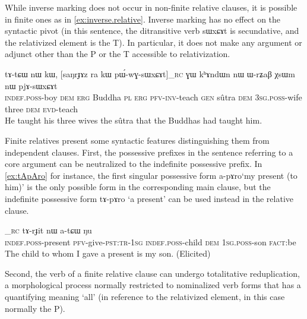 \documentclass[oldfontcommands,oneside,a4paper,11pt]{article}
\newcommand{\ipa}[1]{{\phon #1}} %
\newcommand{\topic}{\textsc{dem}}
\begin{document}
While inverse marking does not occur in non-finite relative clauses, it is possible in finite ones as in \ref{ex:inverse.relative}. Inverse marking has no effect on the syntactic pivot (in this sentence, the ditransitive verb \ipa{sɯxɕɤt} is secundative, and the relativized element is the T). In particular, it does not make any argument or adjunct other than the P or the T accessible to relativization.

     \begin{exe}
   \ex \label{ex:inverse.relative}
 \gll
\ipa{tɤ-tɕɯ}  	\ipa{nɯ}  	\ipa{kɯ,}  	[\ipa{saŋrɟɤz}  	\ipa{ra}  	\ipa{kɯ}  	\ipa{pɯ́-wɣ-sɯxɕɤt}]_{\textsc{rc}}  	\ipa{ɣɯ}  	\ipa{kʰɤndɯn}  	\ipa{nɯ}  	\ipa{ɯ-rʑaβ}  	\ipa{χsɯm}  	\ipa{nɯ}  	\ipa{pjɤ-sɯxɕɤt}  \\
\textsc{indef.poss}-boy \textsc{dem} \textsc{erg} Buddha \textsc{pl} \textsc{erg} \textsc{pfv-inv}-teach   \textsc{gen} sûtra \textsc{dem} \textsc{3sg.poss}-wife three \textsc{dem} \textsc{evd}-teach \\
\glt He taught his three wives the sûtra that the Buddhas had taught him.
\end{exe}


Finite relatives present some syntactic features distinguishing them from independent clauses. First, the possessive prefixes in the sentence referring to a core argument can be neutralized to the indefinite possessive prefix. In \ref{ex:tApAro} for instance, the first singular possessive form \ipa{a-pɤro}`my present (to him)' is the only possible form in the corresponding main clause, but the indefinite possessive form \ipa{tɤ-pɤro} `a present' can be used instead in the relative clause.

		\begin{exe}
\ex \label{ex:tApAro}
\gll
	[\ipa{tɤ-pɤro}  	\ipa{nɯ-mbi-t-a}]_{\textsc{rc}}  	\ipa{tɤ-rɟit}  	\ipa{nɯ}  	\ipa{a-tɕɯ}  	\ipa{ŋu}   \\
	\textsc{indef.poss}-present \textsc{pfv}-give-\textsc{pst:tr-1sg} 	\textsc{indef.poss}-child \topic{} \textsc{1sg.poss}-son \textsc{fact}:be \\
\glt The child to whom I gave a present is my son. (Elicited)
 	  \end{exe} 
 	  
Second, the verb of a finite relative clause can undergo totalitative reduplication, a morphological process normally restricted to nominalized verb forms that has a quantifying meaning `all' (in reference to the relativized element, in this case normally the P).
\end{document}
